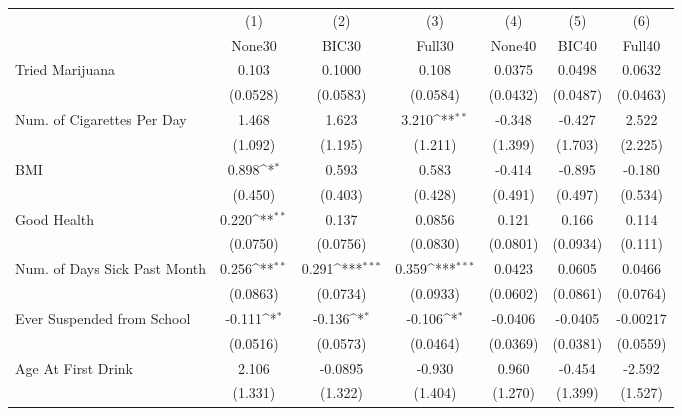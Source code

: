 {
\def\sym#1{\ifmmode^{#1}\else\(^{#1}\)\fi}
\begin{tabular}{l*{6}{c}}
\toprule
            &\multicolumn{1}{c}{(1)}&\multicolumn{1}{c}{(2)}&\multicolumn{1}{c}{(3)}&\multicolumn{1}{c}{(4)}&\multicolumn{1}{c}{(5)}&\multicolumn{1}{c}{(6)}\\
            &\multicolumn{1}{c}{None30}&\multicolumn{1}{c}{BIC30}&\multicolumn{1}{c}{Full30}&\multicolumn{1}{c}{None40}&\multicolumn{1}{c}{BIC40}&\multicolumn{1}{c}{Full40}\\
\midrule
Tried Marijuana&       0.103         &      0.1000         &       0.108         &      0.0375         &      0.0498         &      0.0632         \\
            &    (0.0528)         &    (0.0583)         &    (0.0584)         &    (0.0432)         &    (0.0487)         &    (0.0463)         \\
\addlinespace
Num. of Cigarettes Per Day&       1.468         &       1.623         &       3.210\sym{**} &      -0.348         &      -0.427         &       2.522         \\
            &     (1.092)         &     (1.195)         &     (1.211)         &     (1.399)         &     (1.703)         &     (2.225)         \\
\addlinespace
BMI         &       0.898\sym{*}  &       0.593         &       0.583         &      -0.414         &      -0.895         &      -0.180         \\
            &     (0.450)         &     (0.403)         &     (0.428)         &     (0.491)         &     (0.497)         &     (0.534)         \\
\addlinespace
Good Health &       0.220\sym{**} &       0.137         &      0.0856         &       0.121         &       0.166         &       0.114         \\
            &    (0.0750)         &    (0.0756)         &    (0.0830)         &    (0.0801)         &    (0.0934)         &     (0.111)         \\
\addlinespace
Num. of Days Sick Past Month&       0.256\sym{**} &       0.291\sym{***}&       0.359\sym{***}&      0.0423         &      0.0605         &      0.0466         \\
            &    (0.0863)         &    (0.0734)         &    (0.0933)         &    (0.0602)         &    (0.0861)         &    (0.0764)         \\
\addlinespace
Ever Suspended from School&      -0.111\sym{*}  &      -0.136\sym{*}  &      -0.106\sym{*}  &     -0.0406         &     -0.0405         &    -0.00217         \\
            &    (0.0516)         &    (0.0573)         &    (0.0464)         &    (0.0369)         &    (0.0381)         &    (0.0559)         \\
\addlinespace
Age At First Drink&       2.106         &     -0.0895         &      -0.930         &       0.960         &      -0.454         &      -2.592         \\
            &     (1.331)         &     (1.322)         &     (1.404)         &     (1.270)         &     (1.399)         &     (1.527)         \\
\bottomrule
\end{tabular}
}
